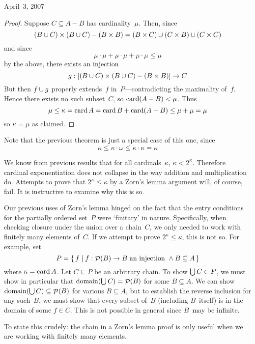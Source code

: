 \begin{lecture}{April~3, 2007}
\begin{proof}
Suppose \(C\subseteq A-B\) has cardinality~\(\mu\). Then, since
\[(B\cup C)\times(B\cup C)-(B\times B)=(B\times C)\cup (C\times B)\cup (C\times C)\]
and since
\[\mu\cdot\mu+\mu\cdot\mu+\mu\cdot\mu\le\mu\]
by the above, there exists an injection
\[g:[(B\cup C)\times(B\cup C)-(B\times B)]\to C\]
But then \(f\cup g\) properly extends~\(f\) in~\(P\)---contradicting the maximality of~\(f\). Hence there exists no such subset~\(C\), so \(\operatorname{card}(A-B)<\mu\).	Thus
\[\mu\le\kappa=\operatorname{card} A=\operatorname{card} B+\operatorname{card}(A-B)\le\mu+\mu=\mu\]
so \(\kappa=\mu\) as claimed.
\end{proof}
\noindent Note that the previous theorem is just a special case of this one, since
\[\kappa\le\kappa\cdot\omega\le\kappa\cdot\kappa=\kappa\]

\begin{rmk}
We know from previous results that for all cardinals~\(\kappa\), \(\kappa<2^{\kappa}\). Therefore cardinal exponentiation does not collapse in the way addition and multiplication do. Attempts to prove that \(2^{\kappa}\le\kappa\) by a Zorn's lemma argument will, of course, fail. It is instructive to examine why this is so.

Our previous uses of Zorn's lemma hinged on the fact that the entry conditions for the partially ordered set~\(P\) were `finitary' in nature. Specifically, when checking closure under the union over a chain~\(C\), we only needed to work with finitely many elements of~\(C\). If we attempt to prove \(2^{\kappa}\le\kappa\), this is not so. For example, set
\[P=\{\,f\mid f:\mathop{\mathcal{P}}(B)\to B\text{ an injection }\land B\subseteq A\,\}\]
where \(\kappa=\operatorname{card} A\). Let \(C\subseteq P\) be an arbitrary chain. To show \(\bigcup C\in P\), we must show in particular that \(\operatorname{domain}(\bigcup C)=\mathop{\mathcal{P}}(B)\) for some \(B\subseteq A\). We can show \(\operatorname{domain}(\bigcup C)\subseteq\mathop{\mathcal{P}}(B)\) for various \(B\subseteq A\), but to establish the reverse inclusion for any such~\(B\), we must show that every subset of~\(B\) (including \(B\)~itself) is in the domain of some \(f\in C\). This is not possible in general since \(B\)~may be infinite.

To state this crudely: the chain in a Zorn's lemma proof is only useful when we are working with finitely many elements.
\end{rmk}


\end{lecture}
